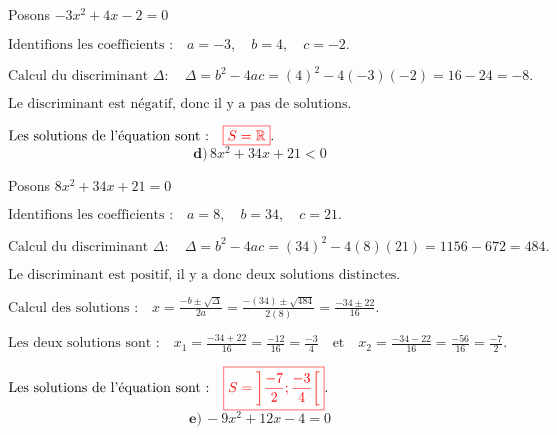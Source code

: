 \documentclass[12pt,a4paper]{article}
\begin{document}
Posons \( -3x^2 + 4x - 2 = 0 \)

\(
\text{Identifions les coefficients :} \quad a = -3, \quad b = 4, \quad c = -2.
\)

\(
\text{Calcul du discriminant } \Delta : \quad
\Delta = b^2 - 4ac = (4)^2 - 4(-3)(-2) = 16 - 24  = -8.
\)

\(
\text{Le discriminant est négatif, donc il y a pas de solutions.}
\)


\(
\text{Les solutions de l'équation sont :} \quad
\textcolor{red}{\boxed{S=\mathbb{R} }}.
\)
\\
\[
\textbf{d)} \, 8x^2 + 34x + 21 < 0
\]

Posons \( 8x^2 + 34x + 21 = 0 \)

\(
\text{Identifions les coefficients :} \quad a = 8, \quad b = 34, \quad c = 21.
\)

\(
\text{Calcul du discriminant } \Delta : \quad
\Delta = b^2 - 4ac = (34)^2 - 4(8)(21) = 1156 - 672  = 484.
\)

\(
\text{Le discriminant est positif, il y a donc deux solutions distinctes.}
\)

\(
\text{Calcul des solutions :} \quad
x = \frac{-b \pm \sqrt{\Delta}}{2a} = \frac{-(34) \pm \sqrt{484}}{2(8)} = \frac{-34 \pm 22}{16}.
\)

\(
\text{Les deux solutions sont :} \quad
x_1 = \frac{-34 + 22}{16} = \frac{-12}{16} = \frac{-3}{4} \quad \text{et} \quad x_2 = \frac{-34 - 22}{16} = \frac{-56}{16} = \frac{-7}{2}.
\)


\(
\text{Les solutions de l'équation sont :} \quad
\textcolor{red}{\boxed{S=\left]\frac{-7}{2};\frac{-3}{4} \right[ }}.
\)
\\

\[ \textbf{e)} \, -9x^2 + 12x - 4 = 0 \]
\end{document}
